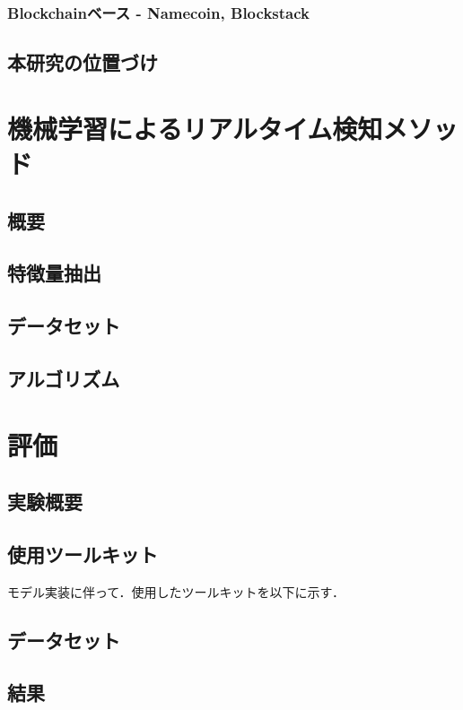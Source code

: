\documentclass[12pt]{jarticle} %
\begin{document}
\subsubsection{Blockchainベース - Namecoin, Blockstack}
\subsection{本研究の位置づけ}



\newpage
\section{機械学習によるリアルタイム検知メソッド}
\subsection{概要}
\subsection{特徴量抽出}
\subsection{データセット}
\subsection{アルゴリズム}


\newpage
\section{評価}
\subsection{実験概要}
\subsection{使用ツールキット}
モデル実装に伴って．使用したツールキットを以下に示す．
\subsection{データセット}
\subsection{結果}
\end{document}
